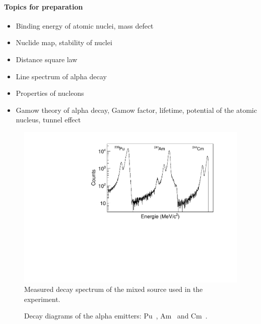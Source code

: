 \paragraph{Topics for preparation}
\begin{itemize}
	\item Binding energy of atomic nuclei, mass defect
	\item Nuclide map, stability of nuclei
	\item Distance square law
	\item Line spectrum of alpha decay
	\item Properties of nucleons
	\item Gamow theory of alpha decay, Gamow factor, lifetime, potential of the atomic nucleus, tunnel effect
\end{itemize}

\begin{figure}
	\begin{center}
		\includegraphics[width=0.9\linewidth]{img/Referenzmessung.pdf}
		\caption{Measured decay spectrum of the mixed source used in the experiment.}
		\label{fig:spectrum}
	\end{center}
\end{figure}
%
\begin{figure}
	\begin{center}
		\caption{Decay diagrams of the alpha emitters: Pu~\cite{NDS2014}, Am~\cite{NDS2006} and Cm~\cite{NDS2008}.}
		\label{fig:schemata}
	\end{center}
\end{figure}
\FloatBarrier
%
